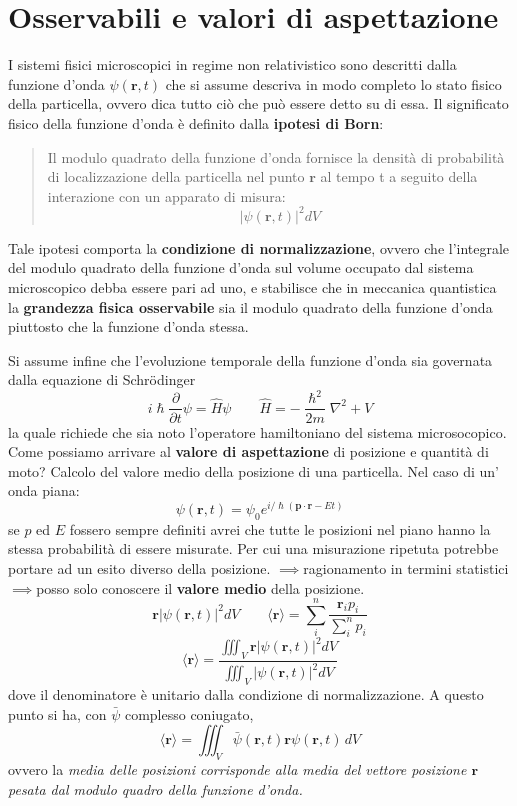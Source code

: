
\section{Osservabili e valori di aspettazione}\label{sec:osservabili-e-valori-di-aspettazione}

I sistemi fisici microscopici in regime non relativistico sono descritti
dalla funzione d'onda \(\psi(\bm{r},t)\) che si assume descriva in modo
completo lo stato fisico della particella, ovvero dica tutto ciò che può
essere detto su di essa.
Il significato fisico della funzione d'onda è
definito dalla \textbf{ipotesi di Born}:
\begin{quote}
    Il modulo quadrato della funzione d'onda fornisce la densità di probabilità
    di localizzazione della particella nel punto \(\bm{r}\) al tempo t a seguito
    della interazione con un apparato di misura:
    \[
        | \psi(\bm{r},t)|^{2}dV
    \]
\end{quote}
Tale ipotesi comporta la \textbf{condizione di normalizzazione},
ovvero che l'integrale del modulo quadrato della funzione d'onda sul
volume occupato dal sistema microscopico debba essere pari ad uno, e
stabilisce che in meccanica quantistica la \textbf{grandezza fisica osservabile}
sia il modulo quadrato della funzione d'onda piuttosto che la funzione d'onda stessa.

Si assume infine che l'evoluzione temporale della funzione d'onda sia
governata dalla equazione di Schrödinger
\[
    i \hslash \frac{\partial}{\partial t} \psi = \hat{H} \psi \qquad \hat{H} = - \frac{\hslash^{2}}{2m} \nabla^{2} + V
\]
la quale richiede che sia noto l'operatore hamiltoniano del sistema microsocopico.
Come possiamo arrivare al \textbf{valore di aspettazione} di
posizione e quantità di moto?
Calcolo del valore medio della posizione
di una particella.
Nel caso di un' onda piana: \[
                                \psi(\bm{r},t) = \psi_{0} e^{ i/\hslash (\bm{p} \cdot \bm{r}-Et) }
\] se \(p\) ed \(E\) fossero sempre definiti avrei che tutte le
posizioni nel piano hanno la stessa probabilità di essere misurate.
Per
cui una misurazione ripetuta potrebbe portare ad un esito diverso della
posizione. \(\implies\)ragionamento in termini
statistici\(\implies\)posso solo conoscere il \textbf{valore medio}
della posizione. \[
                     \bm{r} |\psi(\bm{r},t)|^{2}dV \qquad \langle \bm{r} \rangle = \sum_{i}^{n} \frac{\bm{r}_{i}p_{i}}{\sum_{i}^{n}p_{i}}
\]
\begin{equation}
    \langle \bm{r} \rangle = \frac{\iiint_{V} \bm{r} |\psi(\bm{r},t)|^{2}dV }{\iiint_{V}|\psi(\bm{r},t)|^{2}dV }
    \label{eq:mean-value-quantum-position}
\end{equation} dove il denominatore è unitario dalla condizione di
normalizzazione.
A questo punto si ha, con \(\bar{\psi}\) complesso
coniugato, \[
               \langle \bm{r} \rangle = \iiint_{V} \bar{\psi}(\bm{r},t)\bm{r}\psi(\bm{r},t)\,dV
\] ovvero la \emph{media delle posizioni corrisponde alla media del
vettore posizione \(\bm{r}\) pesata dal modulo quadro della funzione
d'onda.}

